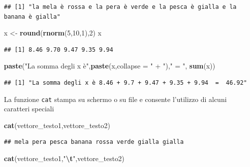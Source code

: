 \documentclass[
  11pt,
]{book}
\newenvironment{Shaded}{\begin{snugshade}}{\end{snugshade}}
\newcommand{\AttributeTok}[1]{\textcolor[rgb]{0.13,0.29,0.53}{#1}}
\newcommand{\DecValTok}[1]{\textcolor[rgb]{0.00,0.00,0.81}{#1}}
\newcommand{\FunctionTok}[1]{\textcolor[rgb]{0.13,0.29,0.53}{\textbf{#1}}}
\newcommand{\NormalTok}[1]{#1}
\newcommand{\OtherTok}[1]{\textcolor[rgb]{0.56,0.35,0.01}{#1}}
\newcommand{\SpecialCharTok}[1]{\textcolor[rgb]{0.81,0.36,0.00}{\textbf{#1}}}
\newcommand{\StringTok}[1]{\textcolor[rgb]{0.31,0.60,0.02}{#1}}
\theoremstyle{mytheoremstyle}
\theoremstyle{mydefstyle}
\begin{document}
\begin{verbatim}
## [1] "la mela è rossa e la pera è verde e la pesca è gialla e la banana è gialla"
\end{verbatim}

\begin{Shaded}
\begin{Highlighting}[]
\NormalTok{x }\OtherTok{\textless{}{-}} \FunctionTok{round}\NormalTok{(}\FunctionTok{rnorm}\NormalTok{(}\DecValTok{5}\NormalTok{,}\DecValTok{10}\NormalTok{,}\DecValTok{1}\NormalTok{),}\DecValTok{2}\NormalTok{)}
\NormalTok{x}
\end{Highlighting}
\end{Shaded}

\begin{verbatim}
## [1] 8.46 9.70 9.47 9.35 9.94
\end{verbatim}

\begin{Shaded}
\begin{Highlighting}[]
\FunctionTok{paste}\NormalTok{(}\StringTok{"La somma degli x è"}\NormalTok{,}\FunctionTok{paste}\NormalTok{(x,}\AttributeTok{collapse =} \StringTok{" + "}\NormalTok{),}\StringTok{" = "}\NormalTok{, }\FunctionTok{sum}\NormalTok{(x))}
\end{Highlighting}
\end{Shaded}

\begin{verbatim}
## [1] "La somma degli x è 8.46 + 9.7 + 9.47 + 9.35 + 9.94  =  46.92"
\end{verbatim}

La funzione \texttt{cat} stampa su schermo o su file e consente l'utilizzo di alcuni caratteri speciali

\begin{Shaded}
\begin{Highlighting}[]
\FunctionTok{cat}\NormalTok{(vettore\_testo1,vettore\_testo2)}
\end{Highlighting}
\end{Shaded}

\begin{verbatim}
## mela pera pesca banana rossa verde gialla gialla
\end{verbatim}

\begin{Shaded}
\begin{Highlighting}[]
\FunctionTok{cat}\NormalTok{(vettore\_testo1,}\StringTok{"}\SpecialCharTok{\textbackslash{}t}\StringTok{"}\NormalTok{,vettore\_testo2)}
\end{Highlighting}
\end{Shaded}
\end{document}
